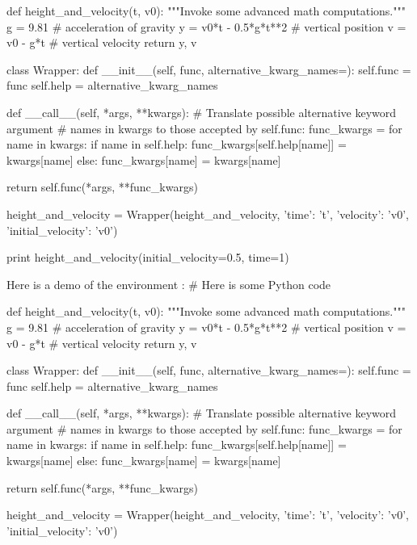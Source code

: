 def height_and_velocity(t, v0):
    """Invoke some advanced math computations."""
    g = 9.81                  # acceleration of gravity
    y = v0*t - 0.5*g*t**2     # vertical position
    v = v0 - g*t              # vertical velocity
    return y, v

class Wrapper:
    def __init__(self, func, alternative_kwarg_names={}):
        self.func = func
        self.help = alternative_kwarg_names

    def __call__(self, *args, **kwargs):
        # Translate possible alternative keyword argument
        # names in kwargs to those accepted by self.func:
        func_kwargs = {}
        for name in kwargs:
            if name in self.help:
                func_kwargs[self.help[name]] = kwargs[name]
            else:
                func_kwargs[name] = kwargs[name]

        return self.func(*args, **func_kwargs)

height_and_velocity = Wrapper(height_and_velocity,
                              {'time': 't',
                               'velocity': 'v0',
                               'initial_velocity': 'v0'})

print height_and_velocity(initial_velocity=0.5, time=1)


\noindent
Here is a demo of the environment :
# Here is some Python code

def height_and_velocity(t, v0):
    """Invoke some advanced math computations."""
    g = 9.81                  # acceleration of gravity
    y = v0*t - 0.5*g*t**2     # vertical position
    v = v0 - g*t              # vertical velocity
    return y, v

class Wrapper:
    def __init__(self, func, alternative_kwarg_names={}):
        self.func = func
        self.help = alternative_kwarg_names

    def __call__(self, *args, **kwargs):
        # Translate possible alternative keyword argument
        # names in kwargs to those accepted by self.func:
        func_kwargs = {}
        for name in kwargs:
            if name in self.help:
                func_kwargs[self.help[name]] = kwargs[name]
            else:
                func_kwargs[name] = kwargs[name]

        return self.func(*args, **func_kwargs)

height_and_velocity = Wrapper(height_and_velocity,
                              {'time': 't',
                               'velocity': 'v0',
                               'initial_velocity': 'v0'})

